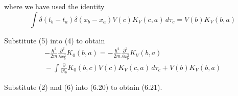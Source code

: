 \documentclass[12pt]{article}
\begin{document}
where we have used the identity
\begin{equation*}
\int\delta(t_b-t_a)\delta(x_b-x_a)V(c)K_V(c,a)\,d\tau_c
=V(b)K_V(b,a)
\end{equation*}

Substitute (5) into (4) to obtain
\begin{multline*}
-\frac{\hbar^2}{2m}\frac{\partial^2}{\partial x_b^2}K_0(b,a)
=-\frac{\hbar^2}{2m}\frac{\partial^2}{\partial x_b^2}K_V(b,a)
\\
{}-\int\frac{\partial}{\partial t_b}K_0(b,c)V(c)K_V(c,a)\,d\tau_c
+V(b)K_V(b,a)
\tag{6}
\end{multline*}

Substitute (2) and (6) into (6.20) to obtain (6.21).
\end{document}
